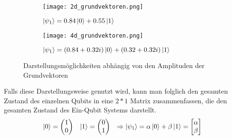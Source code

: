 \documentclass[12pt]{report}
\begin{document}
	\begin{figure}
		\centering
		\begin{subfigure}{.29\textwidth}
		\centering
  		\texttt{[image: 2d\_grundvektoren.png]}
 	 	\caption{$\ket{\psi_{1}} = 0.84\ket{0} + 0.55\ket{1}$}
		\end{subfigure}
		\begin{subfigure}{.7\textwidth}
  		\centering
 	 	\texttt{[image: 4d\_grundvektoren.png]}
 	 	\caption{$\ket{\psi_{1}} = (0.84+0.32i)\ket{0} + (0.32+0.32i)\ket{1}$}
		\end{subfigure}
		\caption[Caption for LOF]{Darstellungsmöglichkeiten abhängig von den Amplituden der Grundvektoren\protect\footnotemark}
	\end{figure}
	Falls diese Darstellungsweise genutzt wird, kann man folglich den gesamten Zustand des einzelnen Qubits in eine $2*1$ Matrix zusammenfassen, die den gesamten Zustand des Ein-Qubit Systems darstellt.
	\begin{align*}
	\ket{0} &= \begin{pmatrix} 1 \\ 0 \end{pmatrix} & \ket{1} &= \begin{pmatrix} 0 \\ 1\end{pmatrix}
	& \Rightarrow \ket{\psi_{1}} &= \alpha\ket{0} + \beta\ket{1} = 
	\begin{bmatrix} \alpha \\ \beta \end{bmatrix}
	\end{align*}
	
\end{document}
